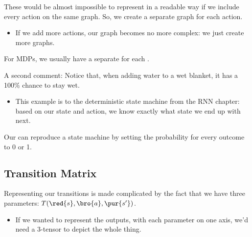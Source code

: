         These would be almost impossible to represent in a readable way if we include every action on the same graph. So, we create a separate graph for each action.
        
        \begin{itemize}
            \item If we add more actions, our graph becomes no more complex: we just create more graphs.\\
        \end{itemize}

        \begin{concept}
            For MDPs, we usually have a separate  for each .
        \end{concept}

        A second comment: Notice that, when adding water to a wet blanket, it has a 100\% chance to stay wet.

        \begin{itemize}
            \item This example is  to the deterministic state machine from the RNN chapter: based on our state and action, we know exactly what state we end up with next.\\
        \end{itemize}

        

        \begin{concept}
            Our  can reproduce a  state machine by setting the probability for every outcome to 0 or 1.
        \end{concept}





    \phantom{}

    \subsection{Transition Matrix}

       Representing our transitions is made complicated by the fact that we have three parameters: $T(\red{s},\bro{a},\pur{s'}) $.

       \begin{itemize}
           \item If we wanted to represent the outputs, with each parameter on one axis, we'd need a 3-tensor to depict the whole thing.
       \end{itemize}

